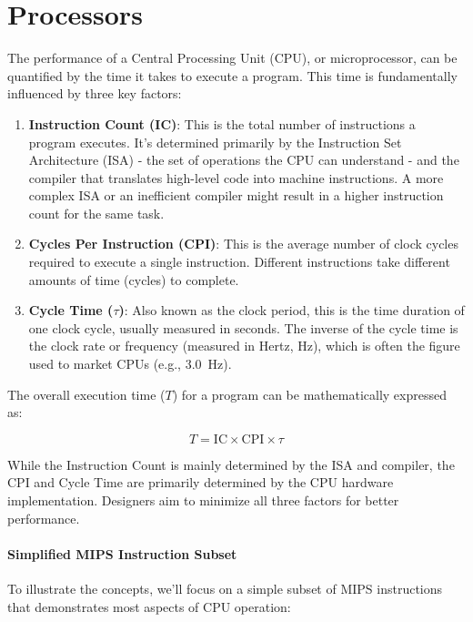 \section{Processors}
The performance of a Central Processing Unit (CPU), or microprocessor, can be
quantified by the time it takes to execute a program. This time is
fundamentally influenced by three key factors:

\begin{enumerate}
    \item \textbf{Instruction Count (IC)}: This is the total number of instructions a program executes. It's determined primarily by the Instruction Set Architecture (ISA) - the set of operations the CPU can understand - and the compiler that translates high-level code into machine instructions. A more complex ISA or an inefficient compiler might result in a higher instruction count for the same task.

    \item \textbf{Cycles Per Instruction (CPI)}: This is the average number of clock cycles required to execute a single instruction. Different instructions take different amounts of time (cycles) to complete.

    \item \textbf{Cycle Time (\(\tau\))}: Also known as the clock period, this is the time duration of one clock cycle, usually measured in seconds. The inverse of the cycle time is the clock rate or frequency (measured in Hertz, Hz), which is often the figure used to market CPUs (e.g., \SI{3.0}{\hertz}).
\end{enumerate}

The overall execution time (\(T\)) for a program can be mathematically
expressed as:

\begin{equation}
    T = \text{IC} \times \text{CPI} \times \tau
\end{equation}

While the Instruction Count is mainly determined by the ISA and compiler, the
CPI and Cycle Time are primarily determined by the CPU hardware implementation.
Designers aim to minimize all three factors for better performance.

\paragraph{Simplified MIPS Instruction Subset} To illustrate the concepts, we'll focus on a simple subset of MIPS instructions
that demonstrates most aspects of CPU operation:

